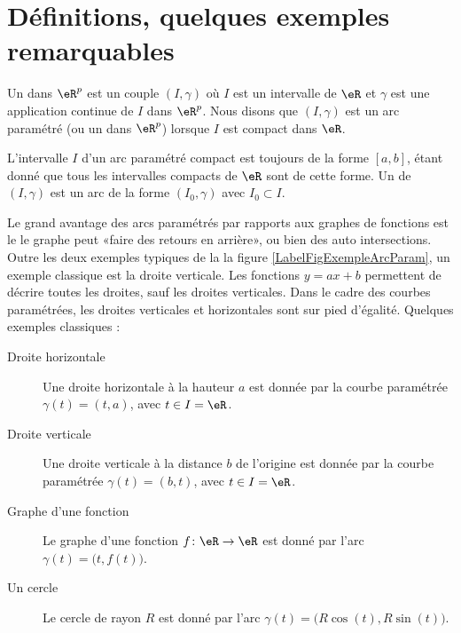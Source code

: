 
\section{Définitions, quelques exemples remarquables}        \label{SecDeExCPar}


\begin{definition}
    Un  dans $\eR^p$ est un couple $(I,\gamma)$ où $I$ est un intervalle de $\eR$ et $\gamma$ est une application continue de $I$ dans $\eR^p$. Nous disons que $(I,\gamma)$ est un arc paramétré  (ou un  dans $\eR^p$) lorsque $I$ est compact dans $\eR$. 
\end{definition}
L'intervalle $I$ d'un arc paramétré compact est toujours de la forme $[a,b]$, étant donné que tous les intervalles compacts de $\eR$ sont de cette forme. Un  de $(I,\gamma)$ est un arc de la forme $(I_0,\gamma)$ avec $I_0\subset I$.


Le grand avantage des arcs paramétrés par rapports aux graphes de fonctions est le le graphe peut «faire des retours en arrière», ou bien des auto intersections. Outre les deux exemples typiques de la la figure \ref{LabelFigExempleArcParam}, un exemple classique est la droite verticale. Les fonctions $y=ax+b$ permettent de décrire toutes les droites, sauf les droites verticales. Dans le cadre des courbes paramétrées, les droites verticales et horizontales sont sur pied d'égalité. Quelques exemples classiques :
\begin{description}
    \item[Droite horizontale] Une droite horizontale à la hauteur $a$ est donnée par la courbe paramétrée $\gamma(t)=(t,a)$, avec $t\in I=\eR$.
    \item[Droite verticale] Une droite verticale à la distance $b$ de l'origine est donnée par la courbe paramétrée $\gamma(t)=(b,t)$, avec $t\in I=\eR$.
    \item[Graphe d'une fonction]\label{PgGrqFnGamma} Le graphe d'une fonction $f\colon \eR\to \eR$ est donné par l'arc $\gamma(t)=\big( t,f(t) \big)$. 
    \item[Un cercle] Le cercle de rayon $R$ est donné par l'arc $\gamma(t)=\big( R\cos(t),R\sin(t) \big)$.
\end{description}

